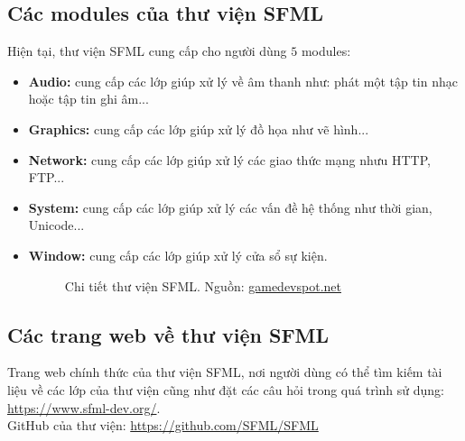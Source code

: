 \subsection{Các modules của thư viện SFML}
Hiện tại, thư viện SFML cung cấp cho người dùng $5$ modules:
\begin{itemize}
\item \textbf{Audio:} cung cấp các lớp giúp xử lý về âm thanh như: phát một tập tin nhạc hoặc tập tin ghi âm...
\item \textbf{Graphics:} cung cấp các lớp giúp xử lý đồ họa như vẽ hình...
\item \textbf{Network:} cung cấp các lớp giúp xử lý các giao thức mạng nhưu HTTP, FTP...
\item \textbf{System:} cung cấp các lớp giúp xử lý các vấn đề hệ thống như thời gian, Unicode...
\item \textbf{Window:} cung cấp các lớp giúp xử lý cửa sổ sự kiện.
\begin{figure}[H]
\caption{Chi tiết thư viện SFML. Nguồn: \url{gamedevspot.net}}
\end{figure}
\end{itemize}


\subsection{Các trang web về thư viện SFML}
Trang web chính thức của thư viện SFML, nơi người dùng có thể tìm kiếm tài liệu về các lớp của thư viện cũng như đặt các câu hỏi trong quá trình sử dụng: \url{https://www.sfml-dev.org/}.\\
GitHub của thư viện: \url{https://github.com/SFML/SFML}